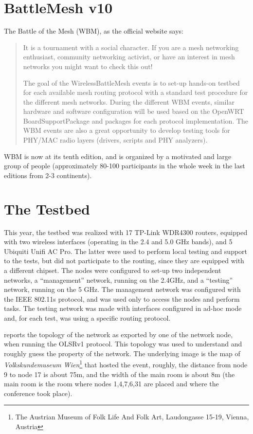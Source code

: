 \documentclass[10pt,onecolumn]{paper}
\begin{document}
\section{BattleMesh v10}
The Battle of the Mesh (WBM), as the official website says:
\begin{quote}
It is a tournament with a social character. If you are a mesh networking
enthusiast, community networking activist, or have an interest in mesh networks
you might want to check this out!

The goal of the WirelessBattleMesh events is to set-up hands-on testbed for each
available mesh routing protocol with a standard test procedure for the different
mesh networks. During the different WBM events, similar hardware and software
configuration will be used based on the OpenWRT BoardSupportPackage and packages
for each protocol implementation. The WBM events are also a great opportunity to
develop testing tools for PHY/MAC radio layers (drivers, scripts and PHY
analyzers).
\end{quote}

WBM is now at its tenth edition, and is organized by a motivated and large group
of people (approximately 80-100 participants in the whole week in the last
editions from 2-3 continents). 

\section{The Testbed}
This year, the testbed was realized with 17 TP-Link WDR4300 routers, equipped
with two wireless interfaces (operating in the 2.4 and 5.0 GHz bands), and 5
Ubiquiti Unifi AC Pro. The latter were used to perform local testing and support
to the tests, but did not participate to the routing, since they are equipped
with a different chipset. The nodes were configured to set-up two independent
networks, a ``management'' network, running on the 2.4GHz, and a ``testing''
network, running on the 5 GHz. The management network was configured with the
IEEE 802.11s protocol, and was used only to access the nodes and perform
tasks. The testing network was made with interfaces configured in ad-hoc mode
and, for each test, was using a specific routing protocol. 

 reports the topology of the network as exported by one of the
network node, when running the OLSRv1 protocol. This topology was used to
understand and roughly guess the property of the network. The underlying image
is the map of \textit{Volkskundemuseum Wien}\footnote{The Austrian Museum of
Folk Life And Folk Art, Laudongasse 15-19, Vienna, Austria}
that hosted the event, roughly, the distance from node 9 to node 17 is about
75m, and the width of the main room is about 8m (the main room is the room where
nodes 1,4,7,6,31 are placed and where the conference took place).
\end{document}
